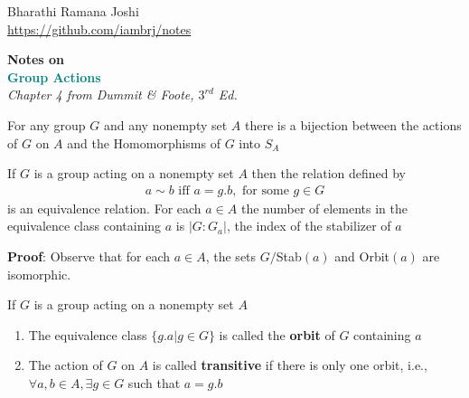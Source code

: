 \documentclass[titlepage, 12pt]{article}
\begin{document}
\begin{titlepage}

	\raggedleft

	\vspace*{\baselineskip}

	{Bharathi Ramana Joshi\\\url{https://github.com/iambrj/notes}}

	\vspace*{0.167\textheight}

	\textbf{\LARGE Notes on}\\[\baselineskip]

	\textbf{\textcolor{teal}{\huge Group Actions}}\\[\baselineskip]

    {\Large \textit{Chapter 4 from Dummit \& Foote, $3^{rd}$ Ed.}}

	\vfill

	\vspace*{3\baselineskip}

\end{titlepage}

\newpage

\begin{proposition}{}{}
    For any group $G$ and any nonempty set $A$ there is a bijection between the
    actions of $G$ on $A$ and the Homomorphisms of $G$ into $S_A$
\end{proposition}

\begin{proposition}{}{}
    If $G$ is a group acting on a nonempty set $A$ then the relation defined by
    \begin{align*}
        a\sim b\textrm{ iff } a = g.b,\textrm{ for some } g\in G
    \end{align*}
    is an equivalence relation. For each $a\in A$ the number of elements in the
    equivalence class containing $a$ is $|G:G_a|$, the index of the stabilizer
    of $a$
\end{proposition}
\textbf{Proof}: Observe that for each $a\in A$, the sets $G/$Stab$(a)$ and
Orbit$(a)$ are isomorphic.

\begin{definition}{}{}
    If $G$ is a group acting on a nonempty set $A$
    \begin{enumerate}
        \item The equivalence class $\{g.a | g\in G\}$ is called the
            \textbf{orbit} of $G$ containing $a$
        \item The action of $G$ on $A$ is called \textbf{transitive} if there
            is only one orbit, i.e., $\forall a, b\in A, \exists g\in G$ such
            that $a = g.b$
    \end{enumerate}
\end{definition}
\end{document}
